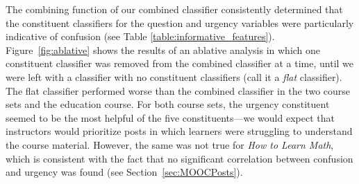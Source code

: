 \documentclass{edm_template}
\begin{document}
The combining function of our combined classifier consistently determined that the constituent classifiers for the question and urgency variables were particularly indicative of confusion (see Table \ref{table:informative_features}). Figure~\ref{fig:ablative} shows the results of an ablative analysis in which one constituent classifier was removed from the combined classifier at a time, until we were left with a classifier with no constituent classifiers (call it a \emph{flat} classifier). The flat classifier performed worse than the combined classifier in the two course sets and the education course. For both course sets, the urgency constituent seemed to be the most helpful of the five constituents---we would expect that instructors would prioritize posts in which learners were struggling to understand the course material. However, the same was not true for \emph{How to Learn Math}, which is consistent with the fact that no significant correlation between confusion and urgency was found (see Section~\ref{sec:MOOCPosts}).

\end{document}
